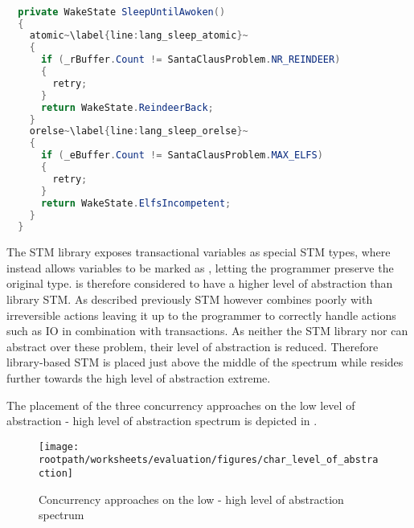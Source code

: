 \begin{lstlisting}[label=lst:lang_SleepUntilAwoken,
  caption={\bscode{SleepUntilAwoken} Method - \ac{STM} Language},
  language=Java,  
  showspaces=false,
  showtabs=false,
  breaklines=true,
  showstringspaces=false,
  breakatwhitespace=true,
  escapechar=~,
  commentstyle=\color{greencomments},
  keywordstyle=\color{bluekeywords},
  stringstyle=\color{redstrings},
  morekeywords={atomic, retry, orelse, var, get, set, ref, out}]  % Start your code-block

  private WakeState SleepUntilAwoken()
  {
    atomic~\label{line:lang_sleep_atomic}~
    {
      if (_rBuffer.Count != SantaClausProblem.NR_REINDEER)
      {
        retry;
      }
      return WakeState.ReindeerBack;
    }
    orelse~\label{line:lang_sleep_orelse}~
    {
      if (_eBuffer.Count != SantaClausProblem.MAX_ELFS)
      {
        retry;
      }
      return WakeState.ElfsIncompetent;
    }
  }
\end{lstlisting}
The \ac{STM} library exposes transactional variables as special \ac{STM} types, where  \stmnamesp instead allows variables to be marked as , letting the programmer preserve the original type. \stmnamesp is therefore considered to have a higher level of abstraction than library \ac{STM}. As described previously \ac{STM} however combines poorly with irreversible actions leaving it up to the programmer to correctly handle actions such as \ac{IO} in combination with transactions. As neither the \ac{STM} library nor \stmnamesp can abstract over these problem, their level of abstraction is reduced. Therefore library-based \ac{STM} is placed just above the middle of the spectrum while \stmname resides further towards the high level of abstraction extreme.

The placement of the three concurrency approaches on the low level of abstraction - high level of abstraction spectrum is depicted in .

\begin{figure}[htbp]
\centering
\texttt{[image: \\rootpath/worksheets/evaluation/figures/char\_level\_of\_abstraction]}
\caption{Concurrency approaches on the low - high level of abstraction spectrum}
\label{fig:char_level_of_abstraction}
\end{figure}

